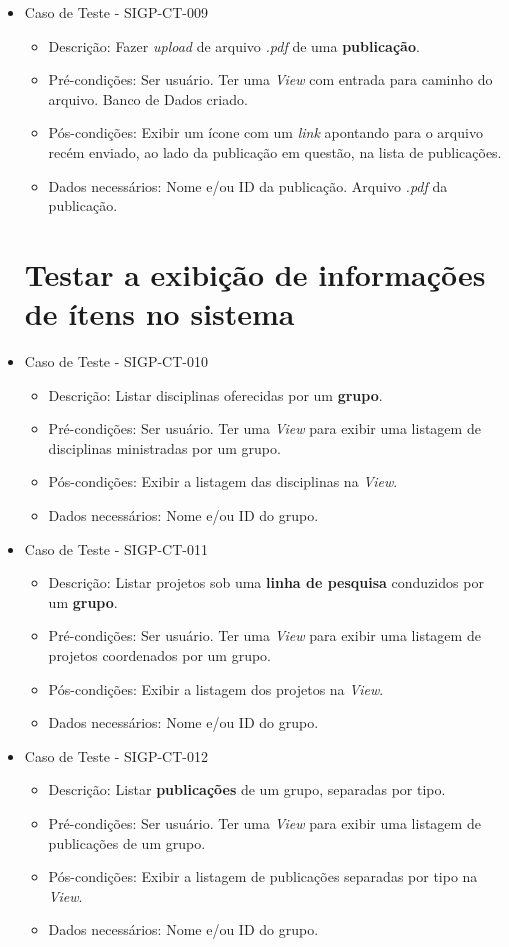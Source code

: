 \documentclass[11pt, a4paper]{book}
\begin{document}
\begin{itemize}
	\item Caso de Teste - SIGP-CT-009
	\begin{itemize}
	\item Descrição: Fazer \emph{upload} de arquivo \emph{.pdf} de uma \textbf{publicação}.
	\item Pré-condições: Ser usuário. Ter uma \emph{View} com entrada para caminho do arquivo. Banco de Dados criado.
	\item Pós-condições: Exibir um ícone com um \emph{link} apontando para o arquivo recém enviado, ao lado da publicação em questão, na lista de publicações.
	\item Dados necessários: Nome e/ou ID da publicação. Arquivo \emph{.pdf} da publicação. 
	\end{itemize}

\newpage
\section{Testar a exibição de informações de ítens no sistema}

	\item Caso de Teste - SIGP-CT-010
	\begin{itemize}
	\item Descrição: Listar disciplinas oferecidas por um \textbf{grupo}.
	\item Pré-condições: Ser usuário. Ter uma \emph{View} para exibir uma listagem de disciplinas ministradas por um grupo.
	\item Pós-condições: Exibir a listagem das disciplinas na \emph{View}.
	\item Dados necessários: Nome  e/ou ID do grupo.
	\end{itemize}
    
	\item Caso de Teste - SIGP-CT-011
	\begin{itemize}
	\item Descrição: Listar projetos sob uma \textbf{linha de pesquisa} conduzidos por um \textbf{grupo}.
	\item Pré-condições: Ser usuário. Ter uma \emph{View} para exibir uma listagem de projetos coordenados por um grupo.
	\item Pós-condições: Exibir a listagem dos projetos na \emph{View}.
	\item Dados necessários: Nome  e/ou ID do grupo.
	\end{itemize}

	\item Caso de Teste - SIGP-CT-012
	\begin{itemize}
	\item Descrição: Listar \textbf{publicações} de um grupo, separadas por tipo.
	\item Pré-condições: Ser usuário. Ter uma \emph{View} para exibir uma listagem de publicações de um grupo.
	\item Pós-condições: Exibir a listagem de publicações separadas por tipo na \emph{View}.
	\item Dados necessários: Nome e/ou ID do grupo.
	\end{itemize}


\end{itemize}
\end{document}
